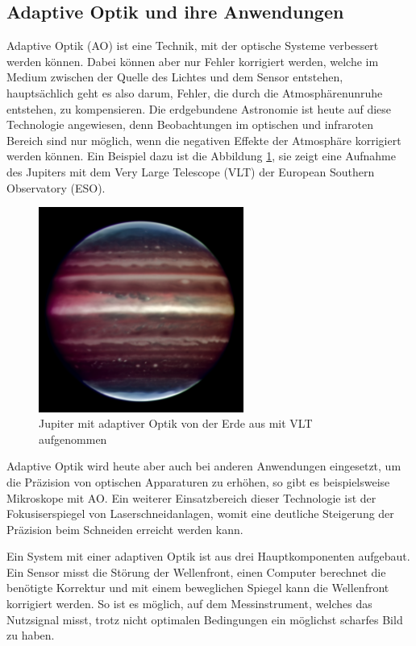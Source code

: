\begin{refsection}
\section{Adaptive Optik und ihre Anwendungen}
Adaptive Optik (AO) ist eine Technik, mit der optische Systeme
verbessert werden können. Dabei können aber nur Fehler korrigiert
werden, welche im Medium zwischen der Quelle des Lichtes und dem Sensor
entstehen, hauptsächlich geht es also darum, Fehler, die durch die
Atmosphärenunruhe entstehen, zu kompensieren. Die erdgebundene Astronomie
ist heute auf diese Technologie angewiesen, denn Beobachtungen im
optischen und infraroten Bereich sind nur möglich, wenn die negativen
Effekte der Atmosphäre korrigiert werden können. Ein Beispiel dazu ist
die Abbildung \ref{fig:jupiter}, sie zeigt eine Aufnahme des Jupiters mit
dem Very Large Telescope (VLT) der European Southern Observatory (ESO).
%
%
\begin{figure}
  \centering
  \includegraphics[width=0.6\textwidth]{adaptiv/images/Jupiter_adaptiv}
  \caption{Jupiter mit adaptiver Optik von der Erde aus mit VLT aufgenommen
    \cite{eso:jupiter}}
  \label{fig:jupiter}
\end{figure}

Adaptive Optik wird heute aber auch bei anderen Anwendungen eingesetzt,
um die Präzision von optischen Apparaturen zu erhöhen, so gibt es
beispielsweise Mikroskope mit AO. Ein weiterer Einsatzbereich dieser
Technologie ist der Fokusiserspiegel von Laserschneidanlagen, womit eine
deutliche Steigerung der Präzision beim Schneiden erreicht werden kann.
%
%

Ein System mit einer adaptiven Optik ist aus drei Hauptkomponenten
aufgebaut. Ein Sensor misst die Störung der Wellenfront, einen Computer
berechnet die benötigte Korrektur und mit einem beweglichen Spiegel
kann die Wellenfront korrigiert werden. So ist es möglich, auf dem
Messinstrument, welches das Nutzsignal misst, trotz nicht optimalen
Bedingungen ein möglichst scharfes Bild zu haben.


\end{refsection}
